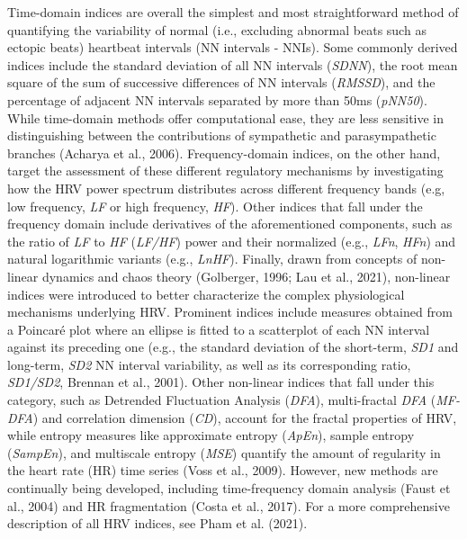 \documentclass[
  english,
  jou,floatsintext]{apa6}
\begin{document}
Time-domain indices are overall the simplest and most straightforward method of quantifying the variability of normal (i.e., excluding abnormal beats such as ectopic beats) heartbeat intervals (NN intervals - NNIs). Some commonly derived indices include the standard deviation of all NN intervals (\emph{SDNN}), the root mean square of the sum of successive differences of NN intervals (\emph{RMSSD}), and the percentage of adjacent NN intervals separated by more than 50ms (\emph{pNN50}). While time-domain methods offer computational ease, they are less sensitive in distinguishing between the contributions of sympathetic and parasympathetic branches (Acharya et al., 2006). Frequency-domain indices, on the other hand, target the assessment of these different regulatory mechanisms by investigating how the HRV power spectrum distributes across different frequency bands (e.g, low frequency, \emph{LF} or high frequency, \emph{HF}). Other indices that fall under the frequency domain include derivatives of the aforementioned components, such as the ratio of \emph{LF} to \emph{HF} (\emph{LF/HF}) power and their normalized (e.g., \emph{LFn}, \emph{HFn}) and natural logarithmic variants (e.g., \emph{LnHF}). Finally, drawn from concepts of non-linear dynamics and chaos theory (Golberger, 1996; Lau et al., 2021), non-linear indices were introduced to better characterize the complex physiological mechanisms underlying HRV. Prominent indices include measures obtained from a Poincaré plot where an ellipse is fitted to a scatterplot of each NN interval against its preceding one (e.g., the standard deviation of the short-term, \emph{SD1} and long-term, \emph{SD2} NN interval variability, as well as its corresponding ratio, \emph{SD1/SD2}, Brennan et al., 2001). Other non-linear indices that fall under this category, such as Detrended Fluctuation Analysis (\emph{DFA}), multi-fractal \emph{DFA} (\emph{MF-DFA}) and correlation dimension (\emph{CD}), account for the fractal properties of HRV, while entropy measures like approximate entropy (\emph{ApEn}), sample entropy (\emph{SampEn}), and multiscale entropy (\emph{MSE}) quantify the amount of regularity in the heart rate (HR) time series (Voss et al., 2009). However, new methods are continually being developed, including time-frequency domain analysis (Faust et al., 2004) and HR fragmentation (Costa et al., 2017). For a more comprehensive description of all HRV indices, see Pham et al. (2021).
\end{document}
